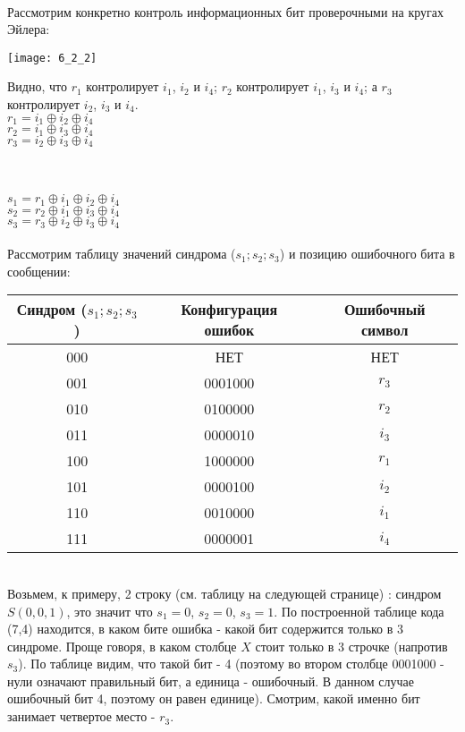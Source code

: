 \\Рассмотрим конкретно контроль информационных бит проверочными на кругах Эйлера:
\\
\begin{minipage}[l]{3.5cm}
\texttt{[image: 6\_2\_2]}
\end{minipage}
\begin{minipage}[r]{9cm}
Видно, что $r_1$ контролирует $i_1$, $i_2$ и $i_4$; $r_2$ контролирует $i_1$, $i_3$ и $i_4$; а $r_3$ контролирует $i_2$, $i_3$ и $i_4$.
\\$r_1 = i_1 \oplus i_2 \oplus i_4$
\\$r_2 = i_1 \oplus i_3 \oplus i_4$
\\$r_3 = i_2 \oplus i_3 \oplus i_4$
\end{minipage}
\\
\\$s_1 = r_1 \oplus i_1 \oplus i_2 \oplus i_4$
\\$s_2 = r_2 \oplus i_1 \oplus i_3 \oplus i_4$
\\$s_3 = r_3 \oplus i_2 \oplus i_3 \oplus i_4$
\\
\\Рассмотрим таблицу значений синдрома ($s_1;s_2;s_3$) и позицию ошибочного бита в сообщении:
\begin{table}[h]
\begin{tabular}{|c|c|c|}
\hline
Синдром ($s_1;s_2;s_3$) & Конфигурация ошибок & Ошибочный символ\\
\hline
000 & НЕТ & НЕТ \\
001 & 0001000 & $r_3$ \\
010 & 0100000 & $r_2$ \\
011 & 0000010 & $i_3$ \\
100 & 1000000 & $r_1$ \\
101 & 0000100 & $i_2$ \\
110 & 0010000 & $i_1$ \\
111 & 0000001 & $i_4$ \\
\hline
\end{tabular}
\end{table}\\
Возьмем, к примеру, 2 строку (см. таблицу на следующей странице) : синдром $S(0,0,1)$, это значит что $s_1 = 0$, $s_2 = 0$, $s_3 = 1$. По построенной таблице кода (7,4) находится, в каком бите ошибка - какой бит содержится только в 3 синдроме. Проще говоря, в каком столбце $X$ стоит только в 3 строчке (напротив $s_3$). По таблице видим, что такой бит - 4 (поэтому во втором столбце 0001000 - нули означают правильный бит, а единица - ошибочный. В данном случае ошибочный бит 4, поэтому он равен единице). Смотрим, какой именно бит занимает четвертое место - $r_3$.
